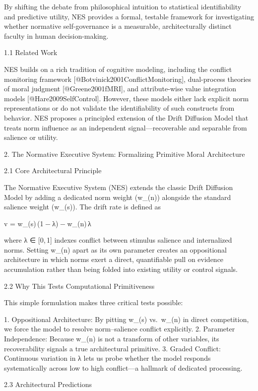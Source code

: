 By shifting the debate from philosophical intuition to statistical
identifiability and predictive utility, NES provides a formal, testable
framework for investigating whether normative self-governance is a
measurable, architecturally distinct faculty in human decision-making.

1.1 Related Work

NES builds on a rich tradition of cognitive modeling, including the
conflict monitoring framework [@Botvinick2001ConflictMonitoring],
dual-process theories of moral judgment [@Greene2001fMRI], and
attribute-wise value integration models [@Hare2009SelfControl]. However,
these models either lack explicit norm representations or do not
validate the identifiability of such constructs from behavior. NES
proposes a principled extension of the Drift Diffusion Model that treats
norm influence as an independent signal—recoverable and separable from
salience or utility.

2. The Normative Executive System: Formalizing Primitive Moral Architecture

2.1 Core Architectural Principle

The Normative Executive System (NES) extends the classic Drift Diffusion
Model by adding a dedicated norm weight (w_(n)) alongside the standard
salience weight (w_(s)). The drift rate is defined as

v = w_(s) (1 − λ) − w_(n) λ

where λ ∈ [0, 1] indexes conflict between stimulus salience and
internalized norms. Setting w_(n) apart as its own parameter creates an
oppositional architecture in which norms exert a direct, quantifiable
pull on evidence accumulation rather than being folded into existing
utility or control signals.

2.2 Why This Tests Computational Primitiveness

This simple formulation makes three critical tests possible:

1.  Oppositional Architecture: By pitting w_(s) vs. w_(n) in direct
    competition, we force the model to resolve norm–salience conflict
    explicitly.
2.  Parameter Independence: Because w_(n) is not a transform of other
    variables, its recoverability signals a true architectural
    primitive.
3.  Graded Conflict: Continuous variation in λ lets us probe whether the
    model responds systematically across low to high conflict—a hallmark
    of dedicated processing.

2.3 Architectural Predictions

